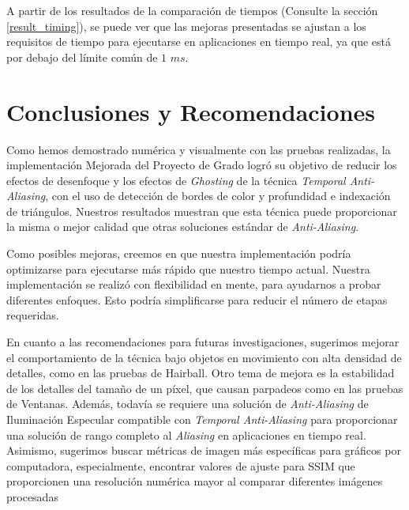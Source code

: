 \documentclass[pregrado]{tesis-usb} %
\begin{document}
A partir de los resultados de la comparación de tiempos (Consulte la sección \ref{result_timing}), se puede ver que las mejoras presentadas se ajustan a los requisitos de tiempo para ejecutarse en aplicaciones en tiempo real, ya que está por debajo del límite común de $1$ $ms$.


\chapter{Conclusiones y Recomendaciones}
Como hemos demostrado numérica y visualmente con las pruebas realizadas, la implementación Mejorada del Proyecto de Grado logró su objetivo de reducir los efectos de desenfoque y los efectos de \textit{Ghosting} de la técnica \textit{Temporal Anti-Aliasing}, con el uso de detección de bordes de color y profundidad e indexación de triángulos. Nuestros resultados muestran que esta técnica puede proporcionar la misma o mejor calidad que otras soluciones estándar de \textit{Anti-Aliasing}.

Como posibles mejoras, creemos en que nuestra implementación podría optimizarse para ejecutarse más rápido que nuestro tiempo actual. Nuestra implementación se realizó con flexibilidad en mente, para ayudarnos a probar diferentes enfoques. Esto podría simplificarse para reducir el número de etapas requeridas.

En cuanto a las recomendaciones para futuras investigaciones, sugerimos mejorar el comportamiento de la técnica bajo objetos en movimiento con alta densidad de detalles, como en las pruebas de Hairball. Otro tema de mejora es la estabilidad de los detalles del tamaño de un píxel, que causan parpadeos como en las pruebas de Ventanas. Además, todavía se requiere una solución de \textit{Anti-Aliasing} de Iluminación Especular compatible con \textit{Temporal Anti-Aliasing} para proporcionar una solución de rango completo al \textit{Aliasing} en aplicaciones en tiempo real. Asimismo, sugerimos buscar métricas de imagen más específicas para gráficos por computadora, especialmente, encontrar valores de ajuste para SSIM que proporcionen una resolución numérica mayor al comparar diferentes imágenes procesadas




\appendix
\end{document}
